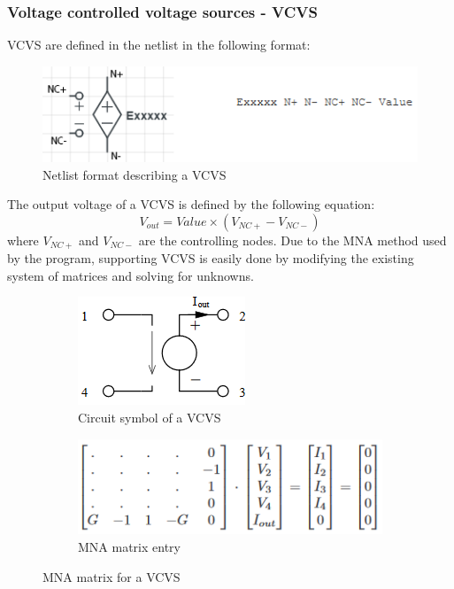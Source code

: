 \documentclass[12pt,a4paper]{article}
\begin{document}
\subsubsection{Voltage controlled voltage sources - VCVS}
VCVS are defined in the netlist in the following format: \par 
\begin{figure} [h!]
	\centering
	\includegraphics[]{E.png}
	\caption{Netlist format describing a VCVS \cite{MNA}}
\end{figure}
The output voltage of a VCVS is defined by the following equation: $$V_{out}=Value \times (V_{NC+}-V_{NC-})$$
where $V_{NC+}$ and $V_{NC-}$ are the controlling nodes. Due to the MNA method used by the program, supporting VCVS is 
easily done by modifying the existing system of matrices and solving for unknowns.

\begin{figure} [h!]
	\centering
	\begin{subfigure}{.5\textwidth}
	  \centering
	  \includegraphics[scale=0.8]{E_diagram.PNG}
	  \caption{Circuit symbol of a VCVS}
	  \label{fig:sub1}
	\end{subfigure}%
	\begin{subfigure}{.5\textwidth}
	  \centering
	  \includegraphics[width= \textwidth]{E_matrices.PNG}
	  \caption{MNA matrix entry}
	  \label{fig:sub2}
	\end{subfigure}
	\caption{MNA matrix for a VCVS \cite{jahn_margraf_habchi_jacob_2003}}
	\label{fig:test}
\end{figure}
\end{document}
